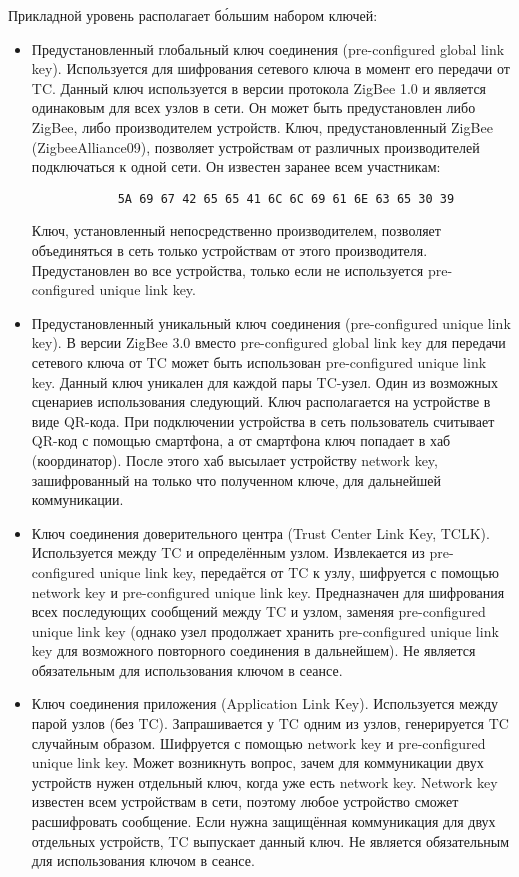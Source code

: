 	Прикладной уровень располагает б\'{о}льшим набором ключей:
	
	\begin{itemize}
		\item Предустановленный глобальный ключ соединения (pre-configured global link key). Используется для 
		шифрования сетевого ключа в момент его передачи от TC. Данный ключ используется в версии протокола
		ZigBee 1.0 и является одинаковым для всех узлов в сети. Он может быть предустановлен либо ZigBee, либо 
		производителем устройств. Ключ, предустановленный ZigBee (ZigbeeAlliance09), позволяет устройствам 
		от различных производителей подключаться к одной сети. Он известен заранее всем участникам:
		\begin{verbatim}
			5A 69 67 42 65 65 41 6C 6C 69 61 6E 63 65 30 39
		\end{verbatim}
		Ключ, установленный непосредственно производителем, позволяет объединяться в сеть только устройствам 
		от этого производителя. Предустановлен во все устройства, только если не используется pre-configured 
		unique link key.
		\item Предустановленный уникальный ключ соединения (pre-configured unique link key). В версии ZigBee 3.0
		вместо pre-configured global link key для передачи сетевого ключа от TC может быть использован 
		pre-configured unique link key. Данный ключ уникален для каждой пары TC-узел. Один из возможных
		сценариев использования следующий. Ключ располагается на устройстве в виде QR-кода. При подключении
		устройства в сеть пользователь считывает QR-код с помощью смартфона, а от смартфона ключ попадает в хаб
		(координатор). После этого хаб высылает устройству network key, зашифрованный на только что полученном
		ключе, для дальнейшей коммуникации.
		\item Ключ соединения доверительного центра (Trust Center Link Key, TCLK). Используется между 
		TC и определённым узлом. Извлекается из pre-configured unique link key, передаётся от TC к узлу, шифруется 
		с помощью network key и pre-configured unique link key. Предназначен для шифрования всех последующих 
		сообщений между TC и узлом, заменяя pre-configured unique link key (однако узел продолжает хранить 
		pre-configured unique link key для возможного повторного соединения в дальнейшем). Не является
		обязательным для использования ключом в сеансе.
		\item Ключ соединения приложения (Application Link Key). Используется между парой узлов (без TC). 
		Запрашивается у TC одним из узлов, генерируется TC случайным образом. Шифруется с помощью 
		network key и pre-configured unique link key. Может возникнуть вопрос, зачем для коммуникации двух
		устройств нужен отдельный ключ, когда уже есть network key. Network key известен всем устройствам 
		в сети, поэтому любое устройство сможет расшифровать сообщение. Если нужна защищённая коммуникация 
		для двух отдельных устройств, TC выпускает данный ключ. Не является обязательным для использования 
		ключом в сеансе.
	\end{itemize}

